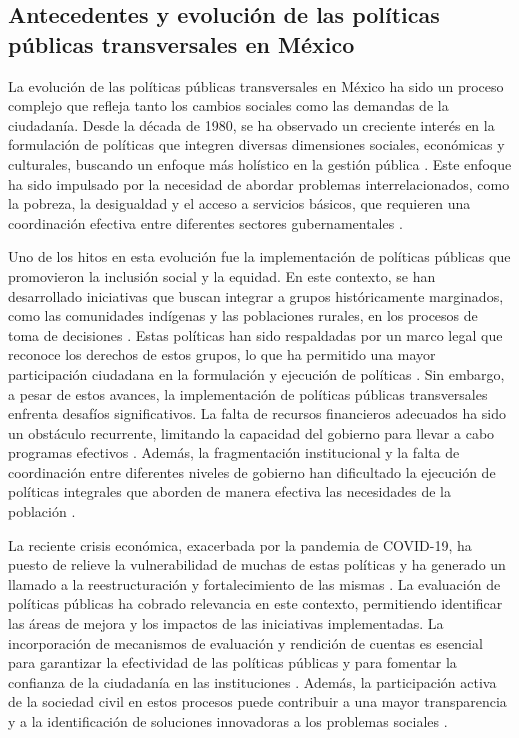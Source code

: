 \documentclass[
  spanish,
  11pt,
  a4paper,
]{scrbook}
\begin{document}
\subsection*{Antecedentes y evolución de las políticas públicas
transversales en
México}\label{antecedentes-y-evoluciuxf3n-de-las-poluxedticas-puxfablicas-transversales-en-muxe9xico}

La evolución de las políticas públicas transversales en México ha sido
un proceso complejo que refleja tanto los cambios sociales como las
demandas de la ciudadanía. Desde la década de 1980, se ha observado un
creciente interés en la formulación de políticas que integren diversas
dimensiones sociales, económicas y culturales, buscando un enfoque más
holístico en la gestión pública
\autocite{PortelaDussan2021,Martinez2023}. Este enfoque ha sido
impulsado por la necesidad de abordar problemas interrelacionados, como
la pobreza, la desigualdad y el acceso a servicios básicos, que
requieren una coordinación efectiva entre diferentes sectores
gubernamentales \autocite{TorresTurismo2022}.

Uno de los hitos en esta evolución fue la implementación de políticas
públicas que promovieron la inclusión social y la equidad. En este
contexto, se han desarrollado iniciativas que buscan integrar a grupos
históricamente marginados, como las comunidades indígenas y las
poblaciones rurales, en los procesos de toma de decisiones
\autocite{Verduzco2022}. Estas políticas han sido respaldadas por un
marco legal que reconoce los derechos de estos grupos, lo que ha
permitido una mayor participación ciudadana en la formulación y
ejecución de políticas \autocite{TorresSalud2018}. Sin embargo, a pesar
de estos avances, la implementación de políticas públicas transversales
enfrenta desafíos significativos. La falta de recursos financieros
adecuados ha sido un obstáculo recurrente, limitando la capacidad del
gobierno para llevar a cabo programas efectivos \autocite{Cadena2012}.
Además, la fragmentación institucional y la falta de coordinación entre
diferentes niveles de gobierno han dificultado la ejecución de políticas
integrales que aborden de manera efectiva las necesidades de la
población \autocite{Silvan2019}.

La reciente crisis económica, exacerbada por la pandemia de COVID-19, ha
puesto de relieve la vulnerabilidad de muchas de estas políticas y ha
generado un llamado a la reestructuración y fortalecimiento de las
mismas \autocite{LanderosOlvera2020}. La evaluación de políticas
públicas ha cobrado relevancia en este contexto, permitiendo identificar
las áreas de mejora y los impactos de las iniciativas implementadas. La
incorporación de mecanismos de evaluación y rendición de cuentas es
esencial para garantizar la efectividad de las políticas públicas y para
fomentar la confianza de la ciudadanía en las instituciones
\autocite{RomeroCardenas2017}. Además, la participación activa de la
sociedad civil en estos procesos puede contribuir a una mayor
transparencia y a la identificación de soluciones innovadoras a los
problemas sociales \autocite{Martinez2019a}.
\end{document}
